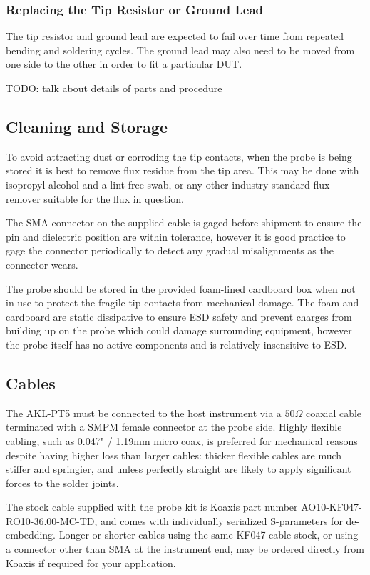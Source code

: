 \documentclass[11pt]{article}
\begin{document}
\subsubsection{Replacing the Tip Resistor or Ground Lead}

The tip resistor and ground lead are expected to fail over time from repeated bending and soldering cycles. The ground
lead may also need to be moved from one side to the other in order to fit a particular DUT.

TODO: talk about details of parts and procedure

\subsection{Cleaning and Storage}

To avoid attracting dust or corroding the tip contacts, when the probe is being stored it is best to remove flux
residue from the tip area. This may be done with isopropyl alcohol and a lint-free swab, or any other industry-standard
flux remover suitable for the flux in question.

The SMA connector on the supplied cable is gaged before shipment to ensure the pin and dielectric position are within
tolerance, however it is good practice to gage the connector periodically to detect any gradual misalignments as the
connector wears.

The probe should be stored in the provided foam-lined cardboard box when not in use to protect the fragile tip contacts
from mechanical damage. The foam and cardboard are static dissipative to ensure ESD safety and prevent charges from
building up on the probe which could damage surrounding equipment, however the probe itself has no active components
and is relatively insensitive to ESD.

\FloatBarrier
\subsection{Cables}

The AKL-PT5 must be connected to the host instrument via a $50 \Omega$ coaxial cable terminated with a SMPM female
connector at the probe side. Highly flexible cabling, such as 0.047" / 1.19mm micro coax, is preferred for mechanical
reasons despite having higher loss than larger cables: thicker flexible cables are much stiffer and springier, and
unless perfectly straight are likely to apply significant forces to the solder joints.

The stock cable supplied with the probe kit is Koaxis part number AO10-KF047-RO10-36.00-MC-TD,
and comes with individually serialized S-parameters for de-embedding. Longer or shorter cables using the same KF047
cable stock, or using a connector other than SMA at the instrument end, may be ordered directly from Koaxis if required
for your application.
\end{document}
